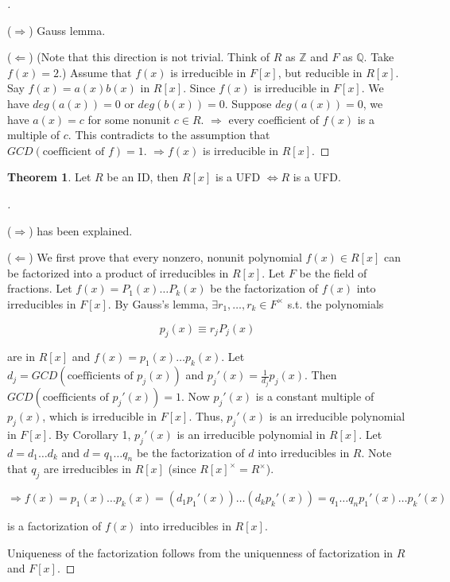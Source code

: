 \documentclass{article}
\theoremstyle{definition}
\newtheorem{thm}{Theorem}
\newenvironment{proofs}[1][\proofname]{%
  \begin{proof}[#1]$ $\par\nobreak\ignorespaces
}{%
  \end{proof}
}
\begin{document}
  \begin{proofs}
	($\Rightarrow$) Gauss lemma. 
	\par ($\Leftarrow$) (Note that this direction is not trivial. Think of $R$ as $\mathbb{Z}$ and $F$ as $\mathbb{Q}$. Take $f(x) = 2$.) Assume that $f(x)$ is irreducible in $F[x]$, but reducible in $R[x]$. Say $f(x) = a(x) b(x)$ in $R[x]$. Since $f(x)$ is irreducible in $F[x]$. We have $deg(a(x)) = 0$ or $deg(b(x)) = 0$. Suppose $deg(a(x)) = 0$, we have $a(x) = c$ for some nonunit $c \in R$. $\Rightarrow$ every coefficient of $f(x)$ is a multiple of $c$. This contradicts to the assumption that $GCD(\text{coefficient of }f) = 1$. $\Rightarrow f(x)$ is irreducible in $R[x]$.  
	
  \end{proofs}
  
  \begin{thm}
	Let $R$ be an ID, then $R[x]$ is a UFD $\Leftrightarrow  R$ is a UFD. 
  \end{thm}
  
  \begin{proofs}
	($\Rightarrow$) has been explained. 
	\par ($\Leftarrow$) We first prove that every nonzero, nonunit polynomial $f(x) \in R[x]$ can be factorized into a product of irreducibles in $R[x]$. Let $F$ be the field of fractions. Let $f(x) = P_1(x) \hdots P_k(x)$ be the factorization of $f(x)$ into irreducibles in $F[x]$. By Gauss's lemma, $\exists r_1, \hdots, r_k \in F^\times$ s.t. the polynomials 
  
	$$p_j(x) \equiv r_j P_j(x)$$
  
	are in $R[x]$ and $f(x) = p_1(x) \hdots p_k(x)$. Let $d_j = GCD(\text{coefficients of }p_j(x))$ and $p_j'(x) = \frac{1}{d_j} p_j(x)$. Then $GCD(\text{coefficients of }p_j'(x)) = 1$. Now $p_j'(x)$ is a constant multiple of $p_j(x)$, which is irreducible in $F[x]$. Thus, $p_j'(x)$ is an irreducible polynomial in $F[x]$. By Corollary 1, $p_j'(x)$ is an irreducible polynomial in $R[x]$. Let $d = d_1 \hdots d_k$ and $d = q_1 \hdots q_n$ be the factorization of $d$ into irreducibles in $R$. Note that $q_j$ are irreducibles in $R[x]$ (since $R[x]^\times = R^\times$). 
  
	$$\Rightarrow f(x) = p_1(x) \hdots p_k(x) = (d_1 p_1'(x)) \hdots (d_k p_k'(x)) = q_1 \hdots q_n p_1'(x) \hdots p_k'(x)$$
  
	is a factorization of $f(x)$ into irreducibles in $R[x]$. 
  
	\par Uniqueness of the factorization follows from the uniquenness of factorization in $R$ and $F[x]$. 
	
  \end{proofs}
  
\end{document}

